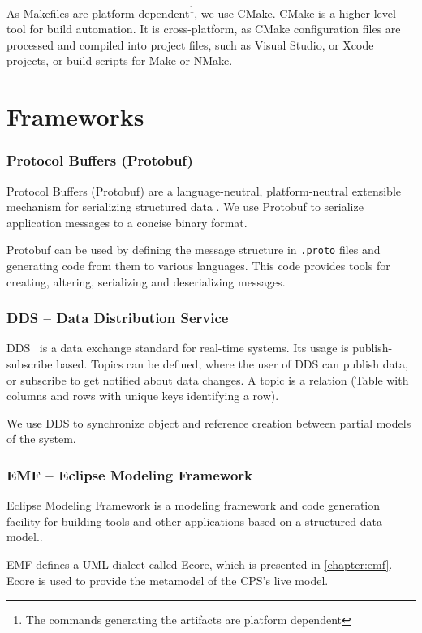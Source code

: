 As Makefiles are platform dependent\footnote{The commands generating the artifacts are platform dependent}, we use CMake.
CMake is a higher level tool for build automation. 
It is cross-platform, as CMake configuration files are processed and compiled into project files, such as Visual Studio, or Xcode projects, or build scripts for Make or NMake.

\section{Frameworks}

\subsubsection{Protocol Buffers (Protobuf)}
Protocol Buffers (Protobuf) are a language-neutral, platform-neutral extensible mechanism for serializing structured data \cite{protobuf}. 
We use Protobuf to serialize application messages to a concise binary format.

Protobuf can be used by defining the message structure in \texttt{.proto} files and generating code from them to various languages. This code provides tools for creating, altering, serializing and deserializing messages.

\subsubsection{DDS -- Data Distribution Service}

DDS~\cite{DDS} is a data exchange standard for real-time systems. 
Its usage is publish-subscribe based.
Topics can be defined, where the user of DDS can publish data, or subscribe to get notified about data changes. A topic is a relation (Table with columns and rows with unique keys identifying a row).

We use DDS to synchronize object and reference creation between partial models of the system.


\subsubsection{EMF -- Eclipse Modeling Framework}

Eclipse Modeling Framework is a modeling framework and code generation facility for building tools and other applications based on a structured data model.\cite{emf}.

EMF defines a UML dialect called Ecore, which is presented in \autoref{chapter:emf}. Ecore is used to provide the metamodel of the CPS's live model.


